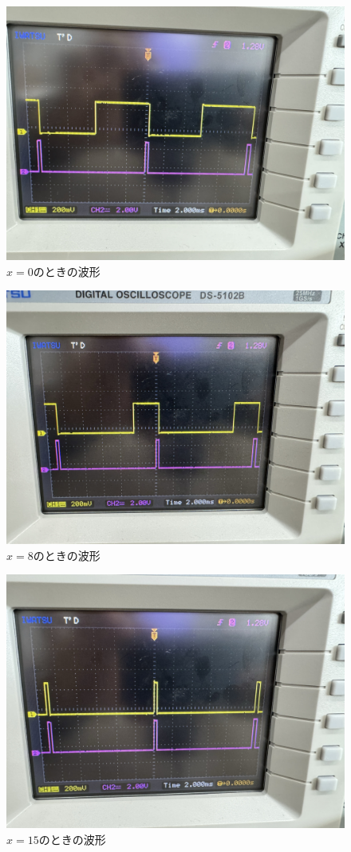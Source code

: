 \documentclass[autodetect-engine, dvi=dvipdfmx, 10pt, a4paper, ja=standard]{bxjsarticle}
\begin{document}
\begin{figure}[H]
	\centering
	\includegraphics[width=0.8\columnwidth]{asset/ex6a_x_0.jpeg}
	\caption{$x = 0$のときの波形}
	\label{fig:ex6-osc-0}
\end{figure}

\begin{figure}[H]
	\centering
	\includegraphics[width=0.8\columnwidth]{asset/ex6a_x_8.jpeg}
	\caption{$x = 8$のときの波形}
	\label{fig:ex6-osc-8}
\end{figure}
\begin{figure}[H]
	\centering
	\includegraphics[width=0.8\columnwidth]{asset/ex6a_x_15.jpeg}
	\caption{$x = 15$のときの波形}
	\label{fig:ex6-osc-15}
\end{figure}
\end{document}
